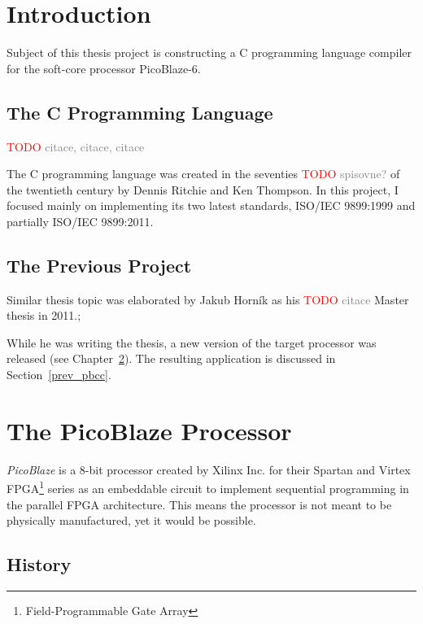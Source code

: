 
\newcommand{\todo}[1]{\textcolor{red}{TODO\:} \textcolor{gray}{#1}}

\chapter{Introduction}\label{introduction}

Subject of this thesis project is constructing a C programming language compiler for the soft-core processor PicoBlaze-6.

    \section{The C Programming Language}

    \todo{citace, citace, citace}

    The C programming language was created in the seventies \todo{spisovne?}
    of the twentieth century by Dennis Ritchie and Ken Thompson. In this project, I focused mainly on implementing its two latest standards, ISO/IEC 9899:1999 and partially ISO/IEC 9899:2011.

    \section{The Previous Project}
    Similar thesis topic was elaborated by Jakub Horník as his \todo{citace}
    Master thesis in 2011.;

    While he was writing the thesis, a new version of the target processor was released (see Chapter~\ref{processor}). The resulting application is discussed in Section~\ref{prev_pbcc}.

\chapter{The PicoBlaze Processor}\label{processor}

\emph{PicoBlaze} is a 8-bit processor created by Xilinx Inc. for their Spartan and Virtex FPGA\footnote{Field-Programmable Gate Array} series as an embeddable circuit to implement sequential programming in the parallel FPGA architecture. This means the processor is not meant to be physically manufactured, yet it would be possible.\cite{PicoBlazeWeb}

    \section{History}

